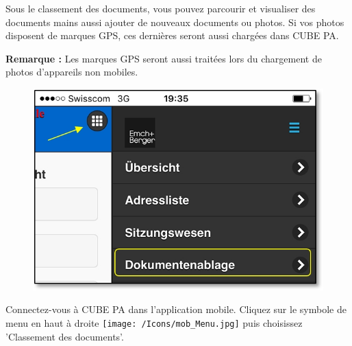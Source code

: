 \vspace{\baselineskip}

Sous le classement des documents, vous pouvez parcourir et visualiser des documents mains aussi ajouter de nouveaux documents ou photos. Si vos photos disposent de marques GPS, ces dernières seront aussi chargées dans CUBE PA.

\vspace{\baselineskip}

\textbf{Remarque :} Les marques GPS seront aussi traitées lors du chargement de photos d'appareils non mobiles.

\vspace{\baselineskip}

\begin{figure}   %
  \vspace{-35pt}      %
  \begin{center}
    \includegraphics[width=1\linewidth]{../chapters/11_Dokumentenablage/pictures/11-mob01_Dokumentenablage_oeffnen.jpg}
  \end{center}
  \vspace{-20pt}
  \vspace{-10pt}
\end{figure}

Connectez-vous à CUBE PA dans l'application mobile. Cliquez sur le symbole de menu en haut à droite \texttt{[image: /Icons/mob\_Menu.jpg]} puis choisissez 'Classement des documents'.

\vspace{.5cm}

